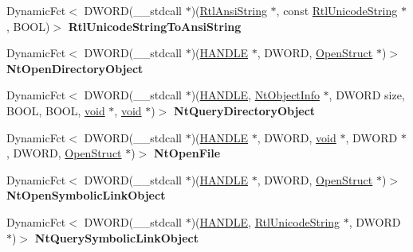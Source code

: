 \begin{DoxyCompactItemize}
\item 
\mbox{\label{struct_n_t_d_l_l_a8cba594b36f8b588e41d0f8833b73034}} 
Dynamic\+Fct$<$ D\+W\+O\+RD(\+\_\+\+\_\+stdcall $\ast$)(\hyperlink{struct_rtl_ansi_string}{Rtl\+Ansi\+String} $\ast$, const \hyperlink{struct_rtl_unicode_string}{Rtl\+Unicode\+String} $\ast$, B\+O\+OL)$>$ {\bfseries Rtl\+Unicode\+String\+To\+Ansi\+String}
\item 
\mbox{\label{struct_n_t_d_l_l_aaba010b9deefb1d42f70e5a4fa51e31d}} 
Dynamic\+Fct$<$ D\+W\+O\+RD(\+\_\+\+\_\+stdcall $\ast$)(\hyperlink{interfacevoid}{H\+A\+N\+D\+LE} $\ast$, D\+W\+O\+RD, \hyperlink{struct_open_struct}{Open\+Struct} $\ast$)$>$ {\bfseries Nt\+Open\+Directory\+Object}
\item 
\mbox{\label{struct_n_t_d_l_l_a4ee326a0bc75f4824a1746834ee127f3}} 
Dynamic\+Fct$<$ D\+W\+O\+RD(\+\_\+\+\_\+stdcall $\ast$)(\hyperlink{interfacevoid}{H\+A\+N\+D\+LE}, \hyperlink{struct_nt_object_info}{Nt\+Object\+Info} $\ast$, D\+W\+O\+RD size, B\+O\+OL, B\+O\+OL, \hyperlink{interfacevoid}{void} $\ast$, \hyperlink{interfacevoid}{void} $\ast$)$>$ {\bfseries Nt\+Query\+Directory\+Object}
\item 
\mbox{\label{struct_n_t_d_l_l_afc034647f136518f5126f9303758b858}} 
Dynamic\+Fct$<$ D\+W\+O\+RD(\+\_\+\+\_\+stdcall $\ast$)(\hyperlink{interfacevoid}{H\+A\+N\+D\+LE} $\ast$, D\+W\+O\+RD, \hyperlink{interfacevoid}{void} $\ast$, D\+W\+O\+RD $\ast$, D\+W\+O\+RD, \hyperlink{struct_open_struct}{Open\+Struct} $\ast$)$>$ {\bfseries Nt\+Open\+File}
\item 
\mbox{\label{struct_n_t_d_l_l_a574d108c158b269cd3b43cb92378f46f}} 
Dynamic\+Fct$<$ D\+W\+O\+RD(\+\_\+\+\_\+stdcall $\ast$)(\hyperlink{interfacevoid}{H\+A\+N\+D\+LE} $\ast$, D\+W\+O\+RD, \hyperlink{struct_open_struct}{Open\+Struct} $\ast$)$>$ {\bfseries Nt\+Open\+Symbolic\+Link\+Object}
\item 
\mbox{\label{struct_n_t_d_l_l_ad064c6b423dca14e6af02a2af16f486f}} 
Dynamic\+Fct$<$ D\+W\+O\+RD(\+\_\+\+\_\+stdcall $\ast$)(\hyperlink{interfacevoid}{H\+A\+N\+D\+LE}, \hyperlink{struct_rtl_unicode_string}{Rtl\+Unicode\+String} $\ast$, D\+W\+O\+RD $\ast$)$>$ {\bfseries Nt\+Query\+Symbolic\+Link\+Object}
\item 

\end{DoxyCompactItemize}
